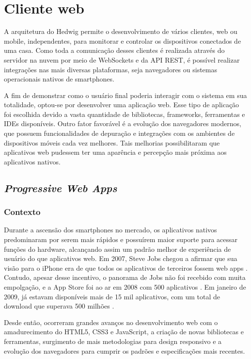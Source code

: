 \section{Cliente web}
A arquitetura do Hedwig permite o desenvolvimento de vários clientes, web ou mobile, independentes, para monitorar e controlar os dispositivos conectados de uma casa. Como toda a comunicação desses clientes é realizada através do servidor na nuvem por meio de WebSockets e da API REST, é possível realizar integrações nas mais diversas plataformas, seja navegadores ou sistemas operacionais nativos de smartphones.

A fim de demonstrar como o usuário final poderia interagir com o sistema em sua totalidade, optou-se por desenvolver uma aplicação web. Esse tipo de aplicação foi escolhida devido a vasta quantidade de bibliotecas, frameworks, ferramentas e IDEs disponíveis. Outro fator favorável é a evolução dos navegadores modernos, que possuem funcionalidades de depuração e integrações com os ambientes de dispositivos móveis cada vez melhores. Tais melhorias possibilitaram que aplicativos web pudessem ter uma aparência e percepção mais próxima aos aplicativos nativos.

\subsection{\emph{Progressive Web Apps}}

\subsubsection{Contexto}
Durante a ascensão dos smartphones no mercado, os aplicativos nativos predominaram por serem mais rápidos e possuírem maior suporte para acessar funções do hardware, alcançando assim um padrão melhor de experiência de usuário do que aplicativos web. Em 2007, Steve Jobs chegou a afirmar que sua visão para o iPhone era de que todos os aplicativos de terceiros fossem web apps \cite{9to5mac}. Contudo, apesar desse incentivo, o panorama de Jobs não foi recebido com muita empolgação, e a App Store foi ao ar em 2008 com 500 aplicativos \cite{ricker}. Em janeiro de 2009, já estavam disponíveis mais de 15 mil aplicativos, com um total de download que superava 500 milhões \cite{myslewski}.

Desde então, ocorreram grandes avanços no desenvolvimento web com o amadurecimento do HTML5, CSS3 e JavaScript, a criação de novas bibliotecas e ferramentas, surgimento de mais metodologias para design responsivo e a evolução dos navegadores para cumprir os padrões e especificações mais recentes.

